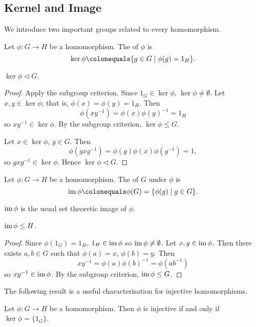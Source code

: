 \subsection{Kernel and Image}
We introduce two important groups related to every homomorphism.

\begin{definition}[Kernel]
Let $\phi\colon G\to H$ be a homomorphism. The  of $\phi$ is
\[\ker\phi\colonequals\{g\in G\mid \phi(g)=1_H\}.\]
\end{definition}

\begin{lemma*}
$\ker\phi\triangleleft G$.
\end{lemma*}

\begin{proof}
Apply the subgroup criterion. Since $1_G\in\ker\phi$, $\ker\phi\neq\emptyset$. Let $x,y\in\ker\phi$; that is, $\phi(x)=\phi(y)=1_H$. Then
\[\phi(xy^{-1})=\phi(x)\phi(y)^{-1}=1_H\]
so $xy^{-1}\in\ker\phi$. By the subgroup criterion, $\ker\phi\le G$.

Let $x\in\ker\phi$, $g\in G$. Then
\[\phi(gxg^{-1})=\phi(g)\phi(x)\phi(g^{-1})=1,\]
so $gxg^{-1}\in\ker\phi$. Hence $\ker\phi\triangleleft G$.
\end{proof}

\begin{definition}[Image]
Let $\phi\colon G\to H$ be a homomorphism. 
The  of $G$ under $\phi$ is
\[\im\phi\colonequals\phi(G)=\{\phi(g)\mid g\in G\}.\]
\end{definition}

\begin{remark}
$\operatorname{im}\phi$ is the usual set theoretic image of $\phi$.
\end{remark}

\begin{lemma*}
$\operatorname{im}\phi\le H$.
\end{lemma*}

\begin{proof}
Since $\phi(1_G)=1_H$, $1_H\in\operatorname{im}\phi$ so $\operatorname{im}\phi\neq\emptyset$. Let $x,y\in\operatorname{im}\phi$. Then there exists $a,b\in G$ such that $\phi(a)=x$, $\phi(b)=y$. Then
\[xy^{-1}=\phi(a)\phi(b)^{-1}=\phi(ab^{-1})\]
so $xy^{-1}\in\operatorname{im}\phi$. By the subgroup criterion, $\operatorname{im}\phi\le G$.
\end{proof}

The following result is a useful characterisation for injective homomorphisms.

\begin{lemma}
Let $\phi\colon G\to H$ be a homomorphism. Then $\phi$ is injective if and only if $\ker\phi=\{1_G\}$.
\end{lemma}

